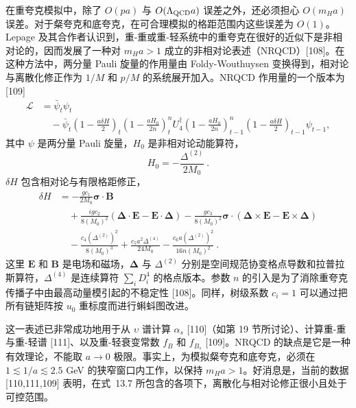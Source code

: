 在重夸克模拟中，除了 $O(pa)$ 与 $O(\Lambda_{\rm QCD} a)$ 误差之外，还必须担心 $O(m_H a)$ 误差。对于粲夸克和底夸克，在可合理模拟的格距范围内这些误差为 $O(1)$。Lepage 及其合作者认识到，重-重或重-轻系统中的重夸克在很好的近似下是非相对论的，因而发展了一种对 $m_H a > 1$ 成立的非相对论表述（NRQCD）[108]。在这种方法中，两分量 Pauli 旋量的作用量由 Foldy-Wouthuysen 变换得到，相对论与离散化修正作为 $1/M$ 和 $p/M$ 的系统展开加入。NRQCD 作用量的一个版本为 [109]
\begin{align}
\mathcal{L}
&= \bar{\psi}_t \psi_t \nonumber\\
&\quad - \bar{\psi}_t
   \left( 1 - \frac{a \delta H}{2} \right)_t
   \left( 1 - \frac{a H_0}{2n} \right)^n_t
   U_4^\dagger
   \left( 1 - \frac{a H_0}{2n} \right)^n_{t-1}
   \left( 1 - \frac{a \delta H}{2} \right)_{t-1} \psi_{t-1},
\label{eq:nrqcdact}
\end{align}
其中 $\psi$ 是两分量 Pauli 旋量，$H_0$ 是非相对论动能算符，
\begin{equation}
H_0 = - \frac{\Delta^{(2)}}{2 M_0} \ .
\label{eq:nrqcdH0}
\end{equation}
$\delta H$ 包含相对论与有限格距修正，
\begin{align}
\delta H
&= - \frac{g c_1}{2 M_0} \boldsymbol{\sigma}\cdot\boldsymbol{B} \nonumber\\
&\quad + \frac{i g c_2}{8 (M_0)^2}
   \left( \boldsymbol{\Delta}\cdot\boldsymbol{E} - \boldsymbol{E}\cdot\boldsymbol{\Delta} \right)
   - \frac{g c_3}{8 (M_0)^2}
   \boldsymbol{\sigma}\cdot
   \left( \boldsymbol{\Delta}\times\boldsymbol{E} - \boldsymbol{E}\times\boldsymbol{\Delta} \right) \nonumber\\
&\quad - \frac{c_4 (\Delta^{(2)})^2}{8 (M_0)^3}
   + \frac{c_5 a^2 \Delta^{(4)}}{24 M_0}
   - \frac{c_6 a (\Delta^{(2)})^2}{16 n (M_0)^2} \ .
\label{eq:NRQCDdeltaH}
\end{align}
这里 $\boldsymbol{E}$ 和 $\boldsymbol{B}$ 是电场和磁场，$\boldsymbol{\Delta}$ 与 $\Delta^{(2)}$ 分别是空间规范协变格点导数和拉普拉斯算符，$\Delta^{(4)}$ 是连续算符 $\sum_i D_i^4$ 的格点版本。参数 $n$ 的引入是为了消除重夸克传播子中由最高动量模引起的不稳定性 [108]。同样，树级系数 $c_i = 1$ 可以通过把所有链矩阵按 $u_0$ 重标度而进行蝌蚪图改进。

这一表述已非常成功地用于从 $\upsilon$ 谱计算 $\alpha_s$ [110]（如第 19 节所讨论）、计算重-重与重-轻谱 [111]、以及重-轻衰变常数 $f_B$ 和 $f_{B_s}$ [109]。NRQCD 的缺点是它是一种有效理论，不能取 $a \to 0$ 极限。事实上，为模拟粲夸克和底夸克，必须在 $1 \lesssim 1/a \lesssim 2.5$ GeV 的狭窄窗口内工作，以保持 $m_H a > 1$。好消息是，当前的数据 [110,111,109] 表明，在式~13.7 所包含的各项下，离散化与相对论修正很小且处于可控范围。

